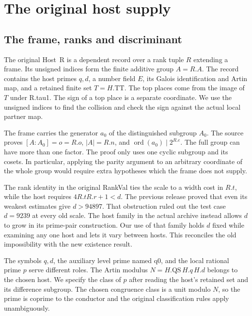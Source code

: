\documentclass[12pt,letterpaper]{article}
\DeclareRobustCommand{\id}[1]{\mbox{\small\ttfamily #1}}
\begin{document}
\section{The original host supply}
\label{sec:host}

\subsection{The frame, ranks and discriminant}

The original \id{Host R} is a dependent record over a rank tuple \(R\) extending a frame. Its unsigned indices form the finite additive group \(A=R.A\). The record contains the host primes \(q,d\), a number field \(E\), its Galois identification and Artin map, and a retained finite set \(T=H.\mathrm{TT}\). The top places come from the image of \(T\) under \id{R.tau1}. The sign of a top place is a separate coordinate. We use the unsigned indices to find the collision and check the sign against the actual local partner map.

The frame carries the generator \(a_0\) of the distinguished subgroup \(A_0\). The source proves \([A:A_0]=o=R.o\), \(|A|=R.n\), and \(\operatorname{ord}(a_0)\mid2^{R.e}\). The full group can have more than one factor. The proof only uses one cyclic subgroup and its cosets. In particular, applying the parity argument to an arbitrary coordinate of the whole group would require extra hypotheses which the frame does not supply.

The rank identity in the original \id{RankVal} ties the scale to a width cost in \(R.t\), while the host requires \(4R.tR.r+1<d\). The previous release proved that even its weakest estimates give \(d>94897\). That obstruction ruled out the test case \(d=9239\) at every old scale. The host family in the actual archive instead allows \(d\) to grow in its prime-pair construction. Our use of that family holds \(d\) fixed while examining any one host and lets it vary between hosts. This reconciles the old impossibility with the new existence result.

The symbols \(q,d\), the auxiliary level prime named \id{q0}, and the local rational prime \(p\) serve different roles. The Artin modulus \(N=H.\mathrm{QS}\,H.q\,H.d\) belongs to the chosen host. We specify the class of \(p\) after reading the host's retained set and its difference subgroup. The chosen congruence class is a unit modulo \(N\), so the prime is coprime to the conductor and the original classification rules apply unambiguously.
\end{document}

